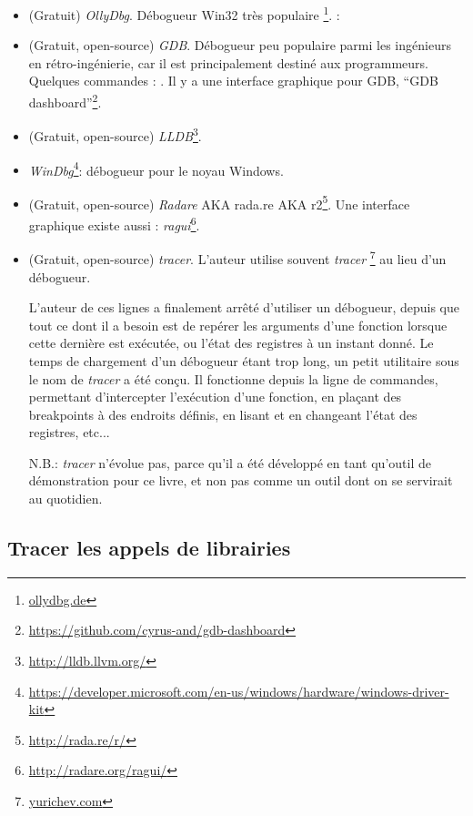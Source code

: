 \begin{itemize}
\item (Gratuit) \emph{OllyDbg}.
Débogueur Win32 très populaire \footnote{\href{http://www.ollydbg.de/}{ollydbg.de}}.
\ShortHotKeyCheatsheet: 

\item (Gratuit, open-source) \emph{GDB}.
Débogueur peu populaire parmi les ingénieurs en rétro-ingénierie, car il est principalement destiné aux programmeurs.
Quelques commandes : .
Il y a une interface graphique pour GDB, ``GDB dashboard''\footnote{\url{https://github.com/cyrus-and/gdb-dashboard}}.

\item (Gratuit, open-source) \emph{LLDB}\footnote{\url{http://lldb.llvm.org/}}.

\item \emph{WinDbg}\footnote{\url{https://developer.microsoft.com/en-us/windows/hardware/windows-driver-kit}}:
débogueur pour le noyau Windows.

\item (Gratuit, open-source) \emph{Radare} \ac{AKA} rada.re \ac{AKA} r2\footnote{\url{http://rada.re/r/}}.
Une interface graphique existe aussi : \emph{ragui}\footnote{\url{http://radare.org/ragui/}}.

\item (Gratuit, open-source) \emph{tracer}.
\label{tracer}
L'auteur utilise souvent \emph{tracer}
\footnote{\href{http://yurichev.com/tracer-en.html}{yurichev.com}}
au lieu d'un débogueur.

L'auteur de ces lignes a finalement arrêté d'utiliser un débogueur, depuis que tout ce dont il a besoin est de repérer les arguments d'une fonction lorsque cette dernière est exécutée, ou l'état des registres à un instant donné.
Le temps de chargement d'un débogueur étant trop long, un petit utilitaire sous le nom de \emph{tracer} a été conçu.
Il fonctionne depuis la ligne de commandes, permettant d'intercepter l'exécution d'une fonction,
en plaçant des breakpoints à des endroits définis, en lisant et en changeant l'état des registres, etc...

N.B.: \emph{tracer} n'évolue pas, parce qu'il a été développé en tant qu'outil de démonstration pour ce livre, et non pas comme un outil dont on se servirait au quotidien.
\end{itemize}

\subsection{Tracer les appels de librairies}

